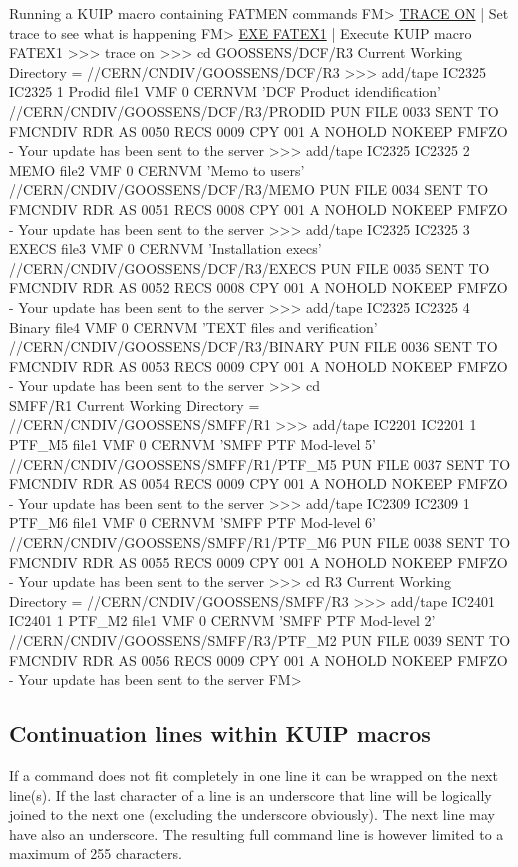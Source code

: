 \begin{XMPt}{Running a KUIP macro containing FATMEN commands}
FM> \underline{TRACE ON}           | Set trace to see what is happening
FM> \underline{EXE FATEX1}         | Execute KUIP macro FATEX1
>>> trace on
>>> cd GOOSSENS/DCF/R3
Current Working Directory = //CERN/CNDIV/GOOSSENS/DCF/R3
>>> add/tape IC2325 IC2325 1 Prodid file1 VMF 0 CERNVM 'DCF Product
idendification'
//CERN/CNDIV/GOOSSENS/DCF/R3/PRODID
PUN FILE 0033 SENT TO   FMCNDIV RDR AS  0050 RECS 0009 CPY  001 A NOHOLD NOKEEP
FMFZO - Your update has been sent to the server
>>> add/tape IC2325 IC2325 2 MEMO   file2 VMF 0 CERNVM 'Memo to users'
//CERN/CNDIV/GOOSSENS/DCF/R3/MEMO
PUN FILE 0034 SENT TO   FMCNDIV RDR AS  0051 RECS 0008 CPY  001 A NOHOLD NOKEEP
FMFZO - Your update has been sent to the server
>>> add/tape IC2325 IC2325 3 EXECS  file3 VMF 0 CERNVM 'Installation execs'
//CERN/CNDIV/GOOSSENS/DCF/R3/EXECS
PUN FILE 0035 SENT TO   FMCNDIV RDR AS  0052 RECS 0008 CPY  001 A NOHOLD NOKEEP
FMFZO - Your update has been sent to the server
>>> add/tape IC2325 IC2325 4 Binary file4 VMF 0 CERNVM 'TEXT files and
verification'
//CERN/CNDIV/GOOSSENS/DCF/R3/BINARY
PUN FILE 0036 SENT TO   FMCNDIV RDR AS  0053 RECS 0009 CPY  001 A NOHOLD NOKEEP
FMFZO - Your update has been sent to the server
>>> cd \\SMFF/R1
Current Working Directory = //CERN/CNDIV/GOOSSENS/SMFF/R1
>>> add/tape IC2201 IC2201 1 PTF\_M5 file1 VMF 0 CERNVM 'SMFF PTF Mod-level 5'
//CERN/CNDIV/GOOSSENS/SMFF/R1/PTF\_M5
PUN FILE 0037 SENT TO   FMCNDIV RDR AS  0054 RECS 0009 CPY  001 A NOHOLD NOKEEP
FMFZO - Your update has been sent to the server
>>> add/tape IC2309 IC2309 1 PTF\_M6 file1 VMF 0 CERNVM 'SMFF PTF Mod-level 6'
//CERN/CNDIV/GOOSSENS/SMFF/R1/PTF\_M6
PUN FILE 0038 SENT TO   FMCNDIV RDR AS  0055 RECS 0009 CPY  001 A NOHOLD NOKEEP
FMFZO - Your update has been sent to the server
>>> cd \bs R3
Current Working Directory = //CERN/CNDIV/GOOSSENS/SMFF/R3
>>> add/tape IC2401 IC2401 1 PTF_M2 file1 VMF 0 CERNVM 'SMFF PTF Mod-level 2'
//CERN/CNDIV/GOOSSENS/SMFF/R3/PTF_M2
PUN FILE 0039 SENT TO   FMCNDIV RDR AS  0056 RECS 0009 CPY  001 A NOHOLD NOKEEP
FMFZO - Your update has been sent to the server
FM>
\end{XMPt}

\subsection{Continuation lines within KUIP macros}

If a command does not fit completely in one line it can be
wrapped on the next line(s). If the last character of a line is
an underscore that line will be logically joined to the next
one (excluding the underscore obviously). The next line may
have also an underscore.
The resulting full command line is however limited to a maximum of 255
characters.

